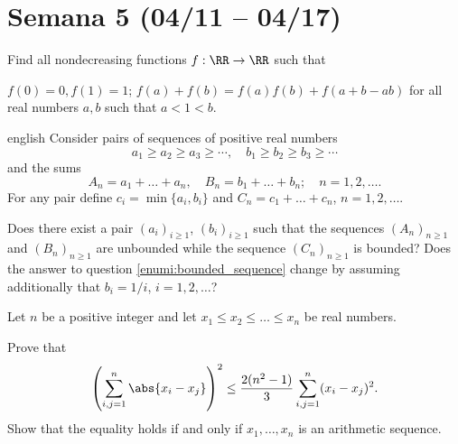 \section{Semana 5 (04/11 -- 04/17)}


\begin{probEG}[ISL 2003/A2]
  Find all nondecreasing functions $f:\RR\to\RR$ such that
  \begin{enumerate}[(i)]
    \ii $f(0)=0,f(1)=1$;
    \ii $f(a)+f(b)=f(a)f(b)+f(a+b-ab)$ for all real numbers $a,b$ such that
    $a<1<b$.
  \end{enumerate}
\end{probEG}

\begin{probEG}[ISL 2003/A3]
  \begin{otherlanguage*}{english}
    Consider pairs of sequences of positive real numbers
    \[a_1\ge a_2\ge a_3\ge\cdots,\quad b_1\ge b_2\ge b_3\ge\cdots\]
    and the sums
    \[A_n=a_1+\dots+a_n,\quad B_n=b_1+\dots+b_n;\quad n=1,2,\dots.\]
    For any pair define $c_i=\min\{a_i,b_i\}$ and $C_n=c_1+\dots+c_n$,
    $n=1,2,\dots$.
    \begin{enumerate}[(1)]
      \ii \label{enumi:bounded_sequence} Does there exist a pair
      $(a_i)_{i\ge 1}$, $(b_i)_{i\ge 1}$ such that the sequences
      $(A_n)_{n\ge 1}$ and $(B_n)_{n\ge 1}$ are unbounded while the sequence
      $(C_n)_{n\ge 1}$ is bounded?
      \ii Does the answer to question \ref{enumi:bounded_sequence} change by
      assuming additionally that $b_i=1/i$, $i=1,2,\dots$?
    \end{enumerate}
  \end{otherlanguage*}
\end{probEG}

\begin{probMR}[ISL 2003/A4]
  Let $n$ be a positive integer and let $x_1\le x_2\le\dots\le x_n$ be real
  numbers.
  \begin{enumerate}[(1)]
    \ii Prove that
    \[
      \left(\sum_{i,j=1}^n\abs{x_i-x_j}\right)^2
      \le\frac{2(n^2-1)}{3}\sum_{i,j=1}^n(x_i-x_j)^2.
    \]
    \ii Show that the equality holds if and only if $x_1,\dots,x_n$ is an
    arithmetic sequence.
  \end{enumerate}
\end{probMR}


